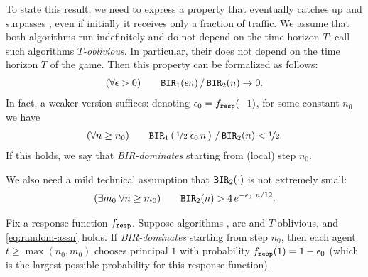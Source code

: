To state this result, we need to express a property that \alg[1] eventually catches up and surpasses \alg[2], even if initially it receives only a fraction of traffic. We assume that both algorithms run indefinitely and do not depend on the time horizon $T$; call such algorithms \emph{$T$-oblivious}. In particular, their \BIR does not depend on the time horizon $T$ of the game.  Then this property can be formalized as follows:
\begin{align}\label{eq:random-better-clean}
(\forall \epsilon>0)\qquad
\mathtt{BIR}_1(\epsilon n)\,/\,\mathtt{BIR}_2(n) \to 0.
\end{align}
In fact, a weaker version suffices:
denoting $\epsilon_0 = f_{\mathtt{resp}}(-1)$, for some constant $n_0$ we have
\begin{align}\label{eq:random-better-weaker}
(\forall n\geq n_0) \qquad
\mathtt{BIR}_1\left(\,\nicefrac{1}{2}\;\epsilon_0\, n\,\right)\,/\, \mathtt{BIR}_2(n)<\nicefrac12.
\end{align}
If this holds, we say that \alg[1] \emph{BIR-dominates} \alg[2] starting from (local) step $n_0$.

We also need a mild technical assumption that $\mathtt{BIR}_2(\cdot)$ is not extremely small:
\begin{align}\label{eq:random-assn}
 (\exists m_0\;\forall n\geq m_0) \qquad
  \mathtt{BIR}_2(n) > 4\,e^{-\epsilon_0\ n/12}.
\end{align}


\begin{theorem}\label{thm:random-clean}
Fix a \HardMaxRandom response function $f_{\mathtt{resp}}$. Suppose algorithms \alg[1], \alg[2] are \bmonotone and $T$-oblivious, and \eqref{eq:random-assn} holds. If \alg[1] \emph{BIR-dominates} \alg[2] starting from step $n_0$, then each agent $t\geq \max(n_0,m_0)$ chooses principal $1$ with probability $f_{\mathtt{resp}}(1) = 1- \epsilon_0$ (which is the largest possible probability for this response function).
\end{theorem}






